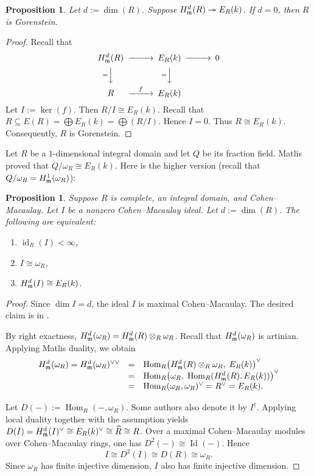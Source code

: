 \documentclass[10. pt,a4paper]{amsart}
\newtheorem{proposition}[theorem]{Proposition}
\theoremstyle{definition}
\theoremstyle{remark}
\newcommand{\id}{\operatorname{id}}
\newcommand{\Hom}{\operatorname{Hom}}
\newcommand{\fm}{\frak{m}}
\begin{document}
\begin{proposition}
	Let $d := \dim(R)$. Suppose $H^d_{\fm}(R) \twoheadrightarrow E_R(k)$. If $d = 0$, then $R$ is Gorenstein.
\end{proposition}

\begin{proof}
	Recall that
	\[
	\begin{CD}
	H^d_{\fm}(R) @>>> E_R(k) @>>> 0 \\
	@V{=}VV @V{=}VV \\
	R @>f>> E_R(k)
	\end{CD}
	\]
	Let $I := \ker(f)$. Then $R/I \cong E_R(k)$. Recall that $R \subseteq E(R) = \bigoplus E_R(k) = \bigoplus (R/I)$. Hence $I = 0$. Thus $R \cong E_R(k)$. Consequently, $R$ is Gorenstein.
\end{proof}

Let $R$ be a $1$-dimensional integral domain and let $Q$ be its fraction field. Matlis proved that $Q / \omega_R \cong E_R(k)$. Here is the higher version (recall that $Q/\omega_R = H^1_{\fm}(\omega_R)$):

\begin{proposition}
	Suppose $R$ is complete, an integral domain, and Cohen--Macaulay. Let $I$ be a nonzero Cohen--Macaulay ideal. Let $d := \dim(R)$. The following are equivalent:
	\begin{enumerate}
		\item[(i)] $\id_R(I) < \infty$,
		\item[(ii)] $I \cong \omega_R$,
		\item[(iii)] $H^d_{\fm}(I) \cong E_R(k)$.
	\end{enumerate}
\end{proposition}

\begin{proof}
	 Since $\dim I = d$, the ideal $I$ is maximal Cohen--Macaulay. The desired claim is in \cite[3.3.28]{BH}.
	
	 By right exactness, $H^d_{\fm}(\omega_R) = H^d_{\fm}(R) \otimes_R \omega_R$. Recall that $H^d_{\fm}(\omega_R)$ is artinian. Applying Matlis duality, we obtain
	\[
	\begin{array}{rcl}
	H^d_{\fm}(\omega_R) = H^d_{\fm}(\omega_R)^{\vee\vee}
	& = & \Hom_R\bigl(H^d_{\fm}(R) \otimes_R \omega_R,\; E_R(k)\bigr)^{\vee} \\
	& = & \Hom_R\bigl(\omega_R,\; \Hom_R(H^d_{\fm}(R), E_R(k))\bigr)^{\vee} \\
	& = & \Hom_R(\omega_R, \omega_R)^{\vee} = R^{\vee} = E_R(k).
	\end{array}
	\]
	
	 Let $D(-) := \Hom_R(-, \omega_R)$. Some authors also denote it by $I^\dagger$. Applying local duality together with the assumption yields $D(I) = H^d_{\fm}(I)^{\vee} \cong E_R(k)^{\vee} \cong \widehat{R} \cong R$. Over a maximal Cohen--Macaulay modules over Cohen--Macaulay rings, one has $D^2(-) \cong \operatorname{Id}(-)$. Hence
	\[
	I \cong D^2(I) \cong D(R) \cong \omega_R.
	\]
	Since $\omega_R$ has finite injective dimension, $I$ also has finite injective dimension.
\end{proof}
\end{document}
